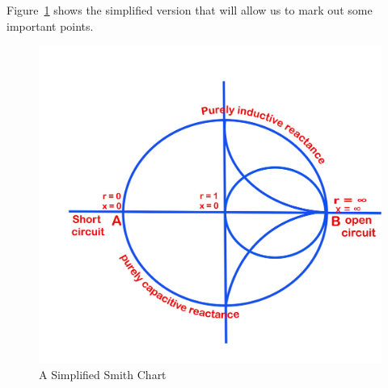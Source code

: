 Figure~\ref{fig:473-drawingjhgfd} shows the simplified version that will allow us to mark out some important points.
\begin{figure}[h]
\centering
\includegraphics[width=0.7\linewidth]{"./graphics/473 drawingjhgfd"}
\caption{A Simplified Smith Chart}
\label{fig:473-drawingjhgfd}
\end{figure}

